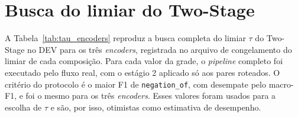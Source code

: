 \chapter[Busca do limiar do Two-Stage]{Busca do limiar do Two-Stage}
\label{ap:tau}

A Tabela~\ref{tab:tau_encoders} reproduz a busca completa do limiar $\tau$ do
Two-Stage no DEV para os três \emph{encoders}, registrada no arquivo de congelamento
do limiar de cada composição. Para cada valor da grade, o \emph{pipeline} completo foi
executado pelo fluxo real, com o estágio 2 aplicado só aos pares roteados. O critério
do protocolo é o maior F1 de \texttt{negation\_of}, com desempate pelo macro-F1, e foi
o mesmo para os três \emph{encoders}. Esses valores foram usados para a escolha de
$\tau$ e são, por isso, otimistas como estimativa de desempenho.



